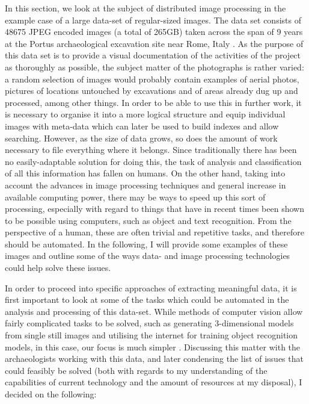 \documentclass [12pt,a4paper]{report}
\begin{document}
In this section, we look at the subject of distributed image processing in the example case of a large data-set of regular-sized images. The data set consists of 48675 JPEG encoded images (a total of 265GB) taken across the span of 9 years at the Portus archaeological excavation site near Rome, Italy \cite{portusproject}. As the purpose of this data set is to provide a visual documentation of the activities of the project as thoroughly as possible, the subject matter of the photographs is rather varied: a random selection of images would probably contain examples of aerial photos, pictures of locations untouched by excavations and of areas already dug up and processed, among other things. In order to be able to use this in further work, it is necessary to organise it into a more logical structure and equip individual images with meta-data which can later be used to build indexes and allow searching. However, as the size of data grows, so does the amount of work necessary to file everything where it belongs. 
Since traditionally there has been no easily-adaptable solution for doing this, the task of analysis and classification of all this information has fallen on humans. On the other hand, taking into account the advances in image processing techniques and general increase in available computing power, there may be ways to speed up this sort of processing, especially with regard to things that have in recent times been shown to be possible using computers, such as object and text recognition. From the perspective of a human, these are often trivial and repetitive tasks, and therefore should be automated. In the following, I will provide some examples of these images and outline some of the ways data- and image processing technologies could help solve these issues.

In order to proceed into specific approaches of extracting meaningful data, it is first important to look at some of the tasks which could be automated in the analysis and processing of this data-set. While methods of computer vision allow fairly complicated tasks to be solved, such as generating 3-dimensional models from single still images and utilising the internet for training object recognition models, in this case, our focus is much simpler \cite{sudo2009associative,saxena2008}. Discussing this matter with the archaeologists working with this data, and later condensing the list of issues that could feasibly be solved (both with regards to my understanding of the capabilities of current technology and the amount of resources at my disposal), I decided on the following:
\end{document}
